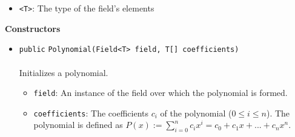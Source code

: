 \begin{itemize}
\item \lstinline|<T>|: The type of the field's elements
\end{itemize}



\textbf{\sffamily Constructors}
\begin{itemize}
\item \lstinline|public| \lstinline|Polynomial|\lstinline|(Field<T> field, T[] coefficients)|\\ \\[-0.6em]
Initializes a polynomial.
\begin{itemize}
\item \lstinline|field|: An instance of the field over which the polynomial is formed.
\item \lstinline|coefficients|: The coefficients $c_i$ of the polynomial ($0 \leq i \leq n$).
 The polynomial is defined as $P(x) := \sum_{i=0}^n c_i x^i = c_0 + c_1
 x + ... + c_n x^n$.
\end{itemize}



\end{itemize}


